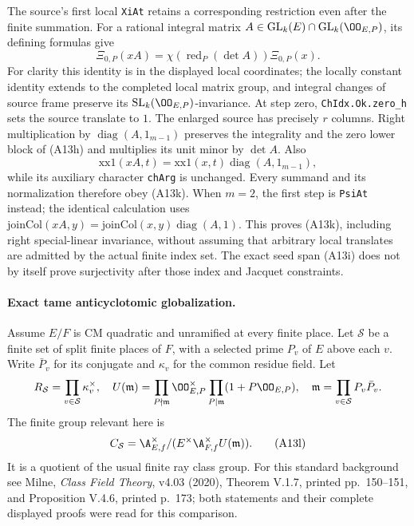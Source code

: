 The source's first local \texttt{XiAt} retains a corresponding
restriction even after the finite summation.  For a rational integral matrix
$A\in\mathrm{GL}_k(E)\cap\mathrm{GL}_k(\OO_{E,P})$, its defining formulas give
\[
       \Xi_{0,P}(xA)=\chi(\operatorname{red}_P(\det A))\Xi_{0,P}(x).
       \tag{A13k}
\]
For clarity this identity is in the displayed local coordinates;
the locally constant identity extends to the completed local
matrix group, and integral changes of source frame preserve its
$\mathrm{SL}_k(\OO_{E,P})$-invariance.
At step zero, \texttt{ChIdx.Ok.zero\_h} sets the source
translate to $1$.  The enlarged source has precisely $r$
columns.  Right multiplication by
$\operatorname{diag}(A,1_{m-1})$ preserves the integrality
and the zero lower block of (A13h) and multiplies its unit
minor by $\det A$.  Also
\[
 \mathrm{xx1}(xA,t)=\mathrm{xx1}(x,t)
                    \operatorname{diag}(A,1_{m-1}),
\]
while its auxiliary character \texttt{chArg} is unchanged.
Every summand and its normalization therefore obey (A13k).
When $m=2$, the first step is \texttt{PsiAt} instead;
the identical calculation uses
$\mathrm{joinCol}(xA,y)=\mathrm{joinCol}(x,y)
\operatorname{diag}(A,1)$.
This proves (A13k), including right special-linear invariance,
without assuming that arbitrary local translates are admitted
by the actual finite index set.  The exact seed span (A13i)
does not by itself prove surjectivity after those index and
Jacquet constraints.

\paragraph{Exact tame anticyclotomic globalization.}
Assume $E/F$ is CM quadratic and unramified at every finite
place.  Let $\mathcal S$ be a finite set of split finite
places of $F$, with a selected prime $P_v$ of $E$ above each
$v$.  Write $\bar P_v$ for its conjugate and $\kappa_v$
for the common residue field.  Let
\[
 R_{\mathcal S}=\prod_{v\in\mathcal S}\kappa_v^\times,
 \quad
 U(\mathfrak m)=
 \prod_{P\nmid\mathfrak m}\OO_{E,P}^\times
 \prod_{P\mid\mathfrak m}(1+P\OO_{E,P}),
 \quad
 \mathfrak m=\prod_{v\in\mathcal S}P_v\bar P_v.
\]
The finite group relevant here is
\[
 C_{\mathcal S}=
 \A_{E,f}^\times/(E^\times\A_{F,f}^\times U(\mathfrak m)).
 \tag{A13l}
\]
It is a quotient of the usual finite ray class group.
For this standard background see Milne,
\emph{Class Field Theory}, v4.03 (2020), Theorem V.1.7,
printed pp.~150--151, and Proposition V.4.6,
printed p.~173; both statements and their complete displayed
proofs were read for this comparison.

